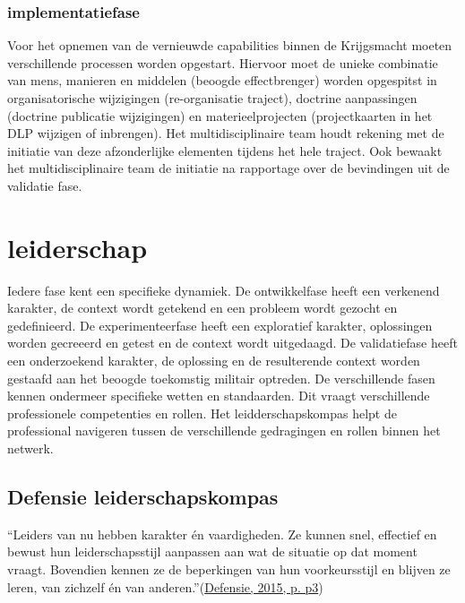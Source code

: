 \documentclass[
]{book}
\begin{document}
\hypertarget{implementatiefase}{%
\subsubsection{implementatiefase}\label{implementatiefase}}

Voor het opnemen van de vernieuwde capabilities binnen de Krijgsmacht moeten verschillende processen worden opgestart. Hiervoor moet de unieke combinatie van mens, manieren en middelen (beoogde effectbrenger) worden opgespitst in organisatorische wijzigingen (re-organisatie traject), doctrine aanpassingen (doctrine publicatie wijzigingen) en materieelprojecten (projectkaarten in het DLP wijzigen of inbrengen). Het multidisciplinaire team houdt rekening met de initiatie van deze afzonderlijke elementen tijdens het hele traject. Ook bewaakt het multidisciplinaire team de initiatie na rapportage over de bevindingen uit de validatie fase.

\hypertarget{leiderschap}{%
\section{leiderschap}\label{leiderschap}}

Iedere fase kent een specifieke dynamiek. De ontwikkelfase heeft een verkenend karakter, de context wordt getekend en een probleem wordt gezocht en gedefinieerd. De experimenteerfase heeft een exploratief karakter, oplossingen worden gecreeerd en getest en de context wordt uitgedaagd. De validatiefase heeft een onderzoekend karakter, de oplossing en de resulterende context worden gestaafd aan het beoogde toekomstig militair optreden. De verschillende fasen kennen ondermeer specifieke wetten en standaarden. Dit vraagt verschillende professionele competenties en rollen. Het leidderschapskompas helpt de professional navigeren tussen de verschillende gedragingen en rollen binnen het netwerk.

\hypertarget{defensie-leiderschapskompas}{%
\subsection{Defensie leiderschapskompas}\label{defensie-leiderschapskompas}}

``Leiders van nu hebben karakter én vaardigheden. Ze kunnen snel, effectief en bewust hun leiderschapsstijl aanpassen aan wat de situatie op dat moment vraagt. Bovendien kennen ze de beperkingen van hun voorkeursstijl en blijven ze leren, van zichzelf én van anderen.''(\protect\hyperlink{ref-ministerie_van_defensie_visie_2015}{Defensie, 2015, p. p3})
\end{document}
